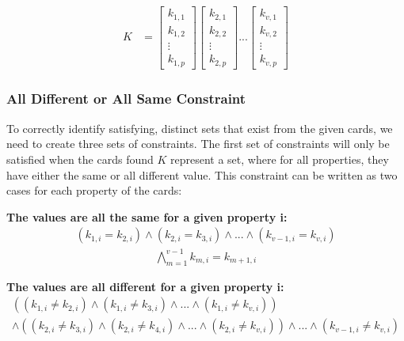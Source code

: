 \documentclass[pageno]{jpaper}
\begin{document}
\begin{align}
    K &= \begin{bmatrix}
           k_{1,1} \\
           k_{1,2} \\
           \vdots \\
           k_{1,p}
         \end{bmatrix}
         \begin{bmatrix}
           k_{2,1} \\
           k_{2,2} \\
           \vdots \\
           k_{2,p}
         \end{bmatrix} ... 
          \begin{bmatrix}
           k_{v,1} \\
           k_{v,2} \\
           \vdots \\
           k_{v,p}
         \end{bmatrix}
  \end{align}

\subsubsection{All Different or All Same Constraint}
To correctly identify satisfying, distinct sets that exist from the given cards, we need to create three sets of constraints. The first set of constraints will only be satisfied when the cards found $K$ represent a set, where for all properties, they have either the same or all different value. This constraint can be written as two cases for each property of the cards:

\textbf{The values are all the same for a given property i:} 
\begin{align}
	(k_{1,i} = k_{2,i}) \wedge (k_{2,i} = k_{3,i}) \wedge ... \wedge (k_{v-1,i} = k_{v,i})
\end{align}
\begin{align}
	\bigwedge \limits_{m=1}^{v-1} k_{m,i} = k_{m+1,i}
\end{align}

\textbf{The values are all different for a given property i:}
\begin{multline}
	((k_{1,i} \neq k_{2,i}) \wedge (k_{1,i} \neq k_{3,i}) \wedge ... \wedge (k_{1,i} \neq k_{v,i})) \\
	 \wedge ((k_{2,i} \neq k_{3,i}) \wedge (k_{2,i} \neq k_{4,i}) \wedge ... \wedge (k_{2,i} \neq k_{v,i})) \wedge 
	 ... \wedge (k_{v-1,i} \neq k_{v,i})
\end{multline}
\end{document}
